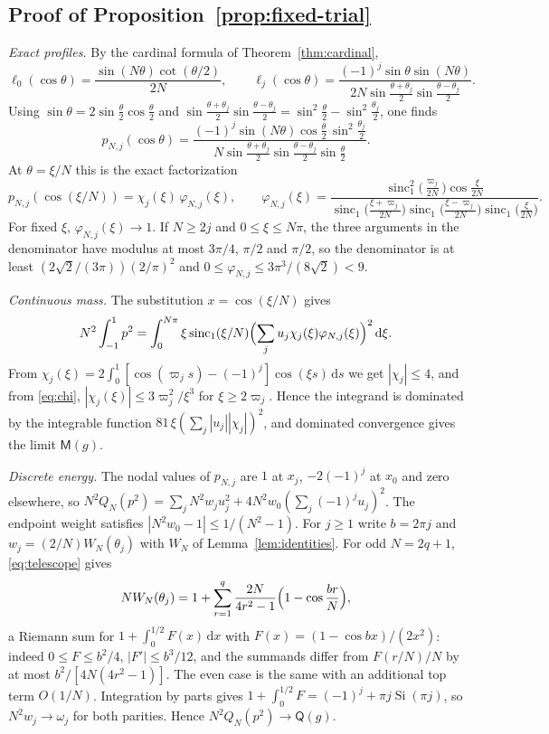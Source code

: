 \documentclass{siamart251216}
\newcommand{\dd}{\,\mathrm d}
\begin{document}
\subsection{\texorpdfstring{Proof of Proposition~\ref{prop:fixed-trial}}{Proof of the fixed-trial proposition}}\label{app:edge-fixed}

\emph{Exact profiles.} By the cardinal formula of
Theorem~\ref{thm:cardinal},
\[
 \ell_0(\cos\theta)=\frac{\sin(N\theta)\cot(\theta/2)}{2N},\qquad
 \ell_j(\cos\theta)=\frac{(-1)^j\sin\theta\sin(N\theta)}
 {2N\sin\frac{\theta+\theta_j}2\sin\frac{\theta-\theta_j}2}.
\]
Using $\sin\theta=2\sin\frac\theta2\cos\frac\theta2$ and
$\sin\frac{\theta+\theta_j}2\sin\frac{\theta-\theta_j}2
=\sin^2\frac\theta2-\sin^2\frac{\theta_j}2$, one finds
\[
 p_{N,j}(\cos\theta)=\frac{(-1)^j\sin(N\theta)\cos\frac\theta2\,\sin^2\frac{\theta_j}2}
 {N\sin\frac{\theta+\theta_j}2\sin\frac{\theta-\theta_j}2\sin\frac\theta2}.
\]
At $\theta=\xi/N$ this is the exact factorization
\begin{equation}\label{eq:pNj-factor}
 p_{N,j}(\cos(\xi/N))=\chi_j(\xi)\,\varphi_{N,j}(\xi),\qquad
 \varphi_{N,j}(\xi)=\frac{\operatorname{sinc}_1^2\bigl(\frac{\varpi_j}{2N}\bigr)
   \cos\frac\xi{2N}}
  {\operatorname{sinc}_1\bigl(\frac{\xi+\varpi_j}{2N}\bigr)
   \operatorname{sinc}_1\bigl(\frac{\xi-\varpi_j}{2N}\bigr)
   \operatorname{sinc}_1\bigl(\frac\xi{2N}\bigr)} .
\end{equation}
For fixed $\xi$, $\varphi_{N,j}(\xi)\to1$. If $N\ge2j$ and
$0\le\xi\le N\pi$, the three arguments in the denominator have modulus at
most $3\pi/4$, $\pi/2$ and $\pi/2$, so the denominator is at least
$(2\sqrt2/(3\pi))(2/\pi)^2$ and
$0\le\varphi_{N,j}\le3\pi^3/(8\sqrt2)<9$.

\emph{Continuous mass.} The substitution $x=\cos(\xi/N)$ gives
\[
 N^2\int_{-1}^1p^2=\int_0^{N\pi}\xi\operatorname{sinc}_1(\xi/N)
 \Bigl(\sum_ju_j\chi_j(\xi)\varphi_{N,j}(\xi)\Bigr)^2\dd\xi .
\]
From $\chi_j(\xi)=2\int_0^1[\cos(\varpi_js)-(-1)^j]\cos(\xi s)\dd s$ we get
$|\chi_j|\le4$, and from \eqref{eq:chi}, $|\chi_j(\xi)|\le3\varpi_j^2/\xi^3$ for
$\xi\ge2\varpi_j$. Hence the integrand is dominated by the integrable function
$81\,\xi(\sum_j|u_j||\chi_j|)^2$, and dominated convergence gives the
limit $\mathsf M(g)$.

\emph{Discrete energy.} The nodal values of $p_{N,j}$ are $1$ at $x_j$,
$-2(-1)^j$ at $x_0$ and zero elsewhere, so
$N^2Q_N(p^2)=\sum_jN^2w_ju_j^2+4N^2w_0(\sum_j(-1)^ju_j)^2$. The endpoint
weight satisfies $|N^2w_0-1|\le1/(N^2-1)$. For $j\ge1$ write
$b=2\pi j$ and $w_j=(2/N)W_N(\theta_j)$ with $W_N$ of
Lemma~\ref{lem:identities}. For odd $N=2q+1$, \eqref{eq:telescope} gives
\[
 NW_N(\theta_j)=1+\sum_{r=1}^q\frac{2N}{4r^2-1}\Bigl(1-\cos\frac{br}N\Bigr),
\]
a Riemann sum for $1+\int_0^{1/2}F(x)\dd x$ with
$F(x)=(1-\cos bx)/(2x^2)$: indeed $0\le F\le b^2/4$,
$|F'|\le b^3/12$, and the summands differ from $F(r/N)/N$ by at most
$b^2/[4N(4r^2-1)]$. The even case is the same with an additional top term
$O(1/N)$. Integration by parts gives
$1+\int_0^{1/2}F=(-1)^j+\pi j\operatorname{Si}(\pi j)$, so $N^2w_j\to\omega_j$
for both parities. Hence $N^2Q_N(p^2)\to\mathsf Q(g)$.
\end{document}

